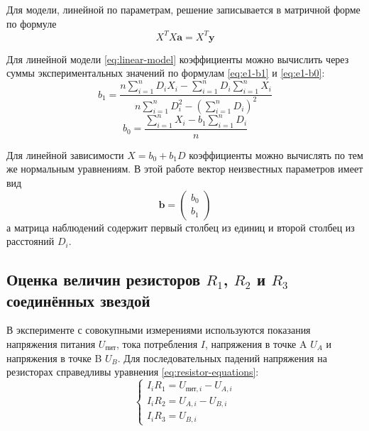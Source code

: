 \documentclass[12pt,a4paper]{article}
\begin{document}
Для модели, линейной по параметрам, решение записывается в матричной форме по формуле 
\begin{equation}
X^TX\mathbf{a} = X^T\mathbf{y}
\tag{4}
\label{eq:mnk-solution}
\end{equation}

Для линейной модели \eqref{eq:linear-model} коэффициенты можно вычислить
через суммы экспериментальных значений по формулам \eqref{eq:e1-b1} и \eqref{eq:e1-b0}:
\begin{equation}
b_1 =
\frac{n\sum\limits_{i = 1}^{n}D_iX_i - \sum\limits_{i = 1}^{n}D_i\sum\limits_{i = 1}^{n}X_i}
{n\sum\limits_{i = 1}^{n}D_i^2 - \left(\sum\limits_{i = 1}^{n}D_i\right)^2}
\tag{4.1}
\label{eq:e1-b1}
\end{equation}
\begin{equation}
b_0 =
\frac{\sum\limits_{i = 1}^{n}X_i - b_1\sum\limits_{i = 1}^{n}D_i}{n}
\tag{4.2}
\label{eq:e1-b0}
\end{equation}

Для линейной зависимости $X = b_0 + b_1D$ коэффициенты можно вычислять
по тем же нормальным уравнениям. В этой работе вектор неизвестных параметров
имеет вид
\begin{equation*}
\mathbf{b} =
\begin{pmatrix}
b_0\\b_1
\end{pmatrix}
\end{equation*}
а матрица наблюдений содержит первый столбец из единиц и второй столбец
из расстояний $D_i$.

\subsection{Оценка величин резисторов $R_1$, $R_2$ и $R_3$ соединённых звездой}

В эксперименте с совокупными измерениями используются показания напряжения
питания $U_{\text{пит}}$, тока потребления $I$, напряжения в точке A $U_A$
и напряжения в точке B $U_B$. Для последовательных падений напряжения на
резисторах справедливы уравнения \eqref{eq:resistor-equations}:
\begin{equation}
\begin{cases}
I_iR_1 = U_{\text{пит},i} - U_{A,i}\\
I_iR_2 = U_{A,i} - U_{B,i}\\
I_iR_3 = U_{B,i}
\end{cases}
\tag{5.1}
\label{eq:resistor-equations}
\end{equation}
\end{document}
